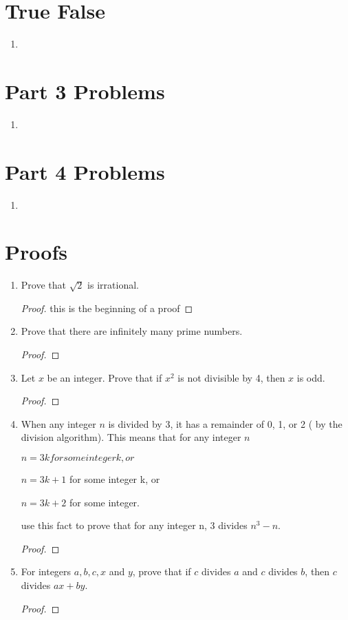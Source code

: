 \documentclass[11pt]{article}
\begin{document}
\section*{True False}
\begin{enumerate}
    \item 
\end{enumerate}
\pagebreak

\section{Part 3 Problems}
\begin{enumerate}
    \item 
\end{enumerate}
\pagebreak

\section{Part 4 Problems}
\begin{enumerate}
    \item 
\end{enumerate}
\pagebreak

\section{Proofs}
\begin{enumerate}
    \item Prove that $\sqrt{2}$ is irrational.
        \begin{proof}
            this is the beginning of a proof
        \end{proof}
    \item Prove that there are infinitely many prime numbers.
        \begin{proof}
        \end{proof}
    \item Let $x$ be an integer. Prove that if $x^2$ is not divisible by 4, then $x$ is odd.
        \begin{proof}
        \end{proof}
    \item When any integer $n$ is divided by 3, it has a remainder of 0, 1, or 2 ( by the division algorithm). This means that for any integer $n$
        \begin{center}
            $n = 3k for some integer k, or$
        \end{center}
        \begin{center}
            $n = 3k+1$ for some integer k, or 
        \end{center}
        \begin{center}
            $n = 3k+2$ for some integer.
        \end{center}
    use this fact to prove that for any integer n, 3 divides $n^3 - n$.
        \begin{proof}
        \end{proof}
    \item For integers $a,b,c,x$ and $y$, prove that if $c$ divides $a$ and $c$ divides $b$, then $c$ divides $ax+by$.
        \begin{proof}
        \end{proof}
\end{enumerate}
\end{document}
